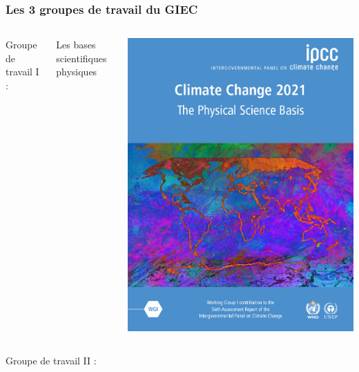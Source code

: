 \documentclass{beamer}
\begin{document}
\begin{frame}
\frametitle{Les 3 groupes de travail du GIEC}

\begin{columns}
  \begin{column}{0.2\textwidth}
Groupe de travail I : 
\end{column}
\begin{column}{0.55\textwidth}
Les bases scientifiques physiques
\end{column}
\begin{column}{0.2\textwidth}
  \includegraphics[scale=0.07]{images/IPCC_AR6_WGI.jpg}
\end{column}
\end{columns}
\vspace{0.3cm}
\begin{columns}
  \begin{column}{0.2\textwidth}
Groupe de travail II : 
\end{column}
\begin{column}{0.55\textwidth}

\end{column}
\end{columns}
\end{frame}
\end{document}
